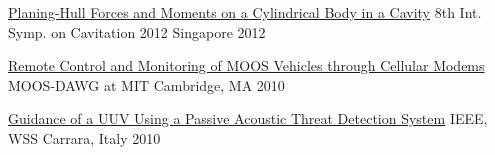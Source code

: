 
\begin{cvhonors}

  \cvhonor
    {\href{http://cav2012.sg/proceedings/pdf/285.pdf}
        {Planing-Hull Forces and Moments on a Cylindrical Body in a Cavity}}
    {8th Int. Symp. on Cavitation 2012} %
    {Singapore} %
    {2012} %

  \cvhonor
    {\href{http://oceanai.mit.edu/moos-dawg10/pmwiki/pmwiki.php?n=Talk.23-Sammut}
        {Remote Control and Monitoring of MOOS Vehicles through Cellular Modems}}
    {MOOS-DAWG at MIT} %
    {Cambridge, MA} %
    {2010} %

  \cvhonor
    {\href{https://ieeexplore.ieee.org/document/5730239}
        {Guidance of a UUV Using a Passive Acoustic Threat Detection System}}
    {IEEE, WSS} %
    {Carrara, Italy} %
    {2010} %


\end{cvhonors}
